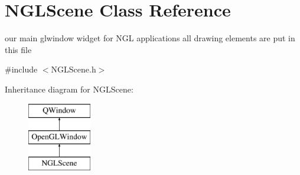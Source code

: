 \hypertarget{classNGLScene}{\section{N\-G\-L\-Scene Class Reference}
\label{classNGLScene}
}


our main glwindow widget for N\-G\-L applications all drawing elements are put in this file  




{\ttfamily \#include $<$N\-G\-L\-Scene.\-h$>$}

Inheritance diagram for N\-G\-L\-Scene\-:\begin{figure}[H]
\begin{center}
\leavevmode
\includegraphics[height=3.000000cm]{classNGLScene}
\end{center}
\end{figure}
